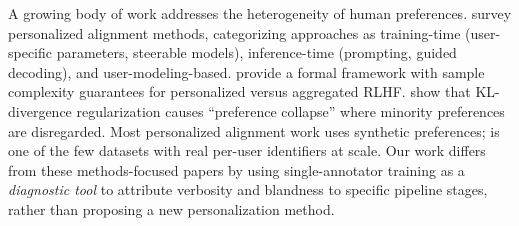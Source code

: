 A growing body of work addresses the heterogeneity of human preferences. \citet{xie2025survey} survey personalized alignment methods, categorizing approaches as training-time (user-specific parameters, steerable models), inference-time (prompting, guided decoding), and user-modeling-based. \citet{park2024rlhf} provide a formal framework with sample complexity guarantees for personalized versus aggregated RLHF. \citet{li2024preference} show that KL-divergence regularization causes ``preference collapse'' where minority preferences are disregarded. Most personalized alignment work uses synthetic preferences; \prism \citep{kirk2024prism} is one of the few datasets with real per-user identifiers at scale. Our work differs from these methods-focused papers by using single-annotator training as a \emph{diagnostic tool} to attribute verbosity and blandness to specific pipeline stages, rather than proposing a new personalization method.
